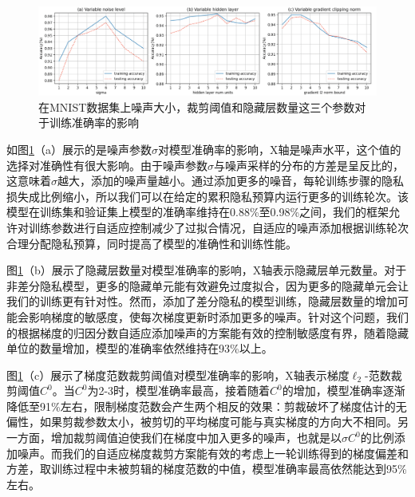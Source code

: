 \begin{figure}[!hbt]
\centering
	\includegraphics[scale=0.32]{fig2/C3/第三章实验一}%
	\caption{在MNIST数据集上噪声大小，裁剪阈值和隐藏层数量这三个参数对于训练准确率的影响}
	\label{fig:在MNIST数据集上噪声大小，裁剪阈值和隐藏层数量这三个参数对于训练准确率的影响}	
\end{figure}

如图\ref{fig:在MNIST数据集上噪声大小，裁剪阈值和隐藏层数量这三个参数对于训练准确率的影响}（a）展示的是噪声参数$\sigma$对模型准确率的影响，X轴是噪声水平，这个值的选择对准确性有很大影响。由于噪声参数$\sigma$与噪声采样的分布的方差是呈反比的，这意味着$\sigma$越大，添加的噪声量越小。通过添加更多的噪音，每轮训练步骤的隐私损失成比例缩小，所以我们可以在给定的累积隐私预算内运行更多的训练轮次。该模型在训练集和验证集上模型的准确率维持在0.88\%至0.98\%之间，我们的框架允许对训练参数进行自适应控制减少了过拟合情况，自适应的噪声添加根据训练轮次合理分配隐私预算，同时提高了模型的准确性和训练性能。

图\ref{fig:在MNIST数据集上噪声大小，裁剪阈值和隐藏层数量这三个参数对于训练准确率的影响}（b）展示了隐藏层数量对模型准确率的影响，X轴表示隐藏层单元数量。对于非差分隐私模型，更多的隐藏单元能有效避免过度拟合，因为更多的隐藏单元会让我们的训练更有针对性。然而，添加了差分隐私的模型训练，隐藏层数量的增加可能会影响梯度的敏感度，使每次梯度更新时添加更多的噪声。针对这个问题，我们的根据梯度的归因分数自适应添加噪声的方案能有效的控制敏感度有界，随着隐藏单位的数量增加，模型的准确率依然维持在93\%以上。

图\ref{fig:在MNIST数据集上噪声大小，裁剪阈值和隐藏层数量这三个参数对于训练准确率的影响}（c）展示了梯度范数裁剪阈值对模型准确率的影响，X轴表示梯度$\ell_{2}$-范数裁剪阈值$C^{0}$。当$C^{0}$为2-3时，模型准确率最高，接着随着$C^{0}$的增加，模型准确率逐渐降低至91\%左右，限制梯度范数会产生两个相反的效果：剪裁破坏了梯度估计的无偏性，如果剪裁参数太小，被剪切的平均梯度可能与真实梯度的方向大不相同。另一方面，增加裁剪阈值迫使我们在梯度中加入更多的噪声，也就是以$\sigma$$C^{0}$的比例添加噪声。而我们的自适应梯度裁剪方案能有效的考虑上一轮训练得到的梯度偏差和方差，取训练过程中未被剪辑的梯度范数的中值，模型准确率最高依然能达到95\%左右。

